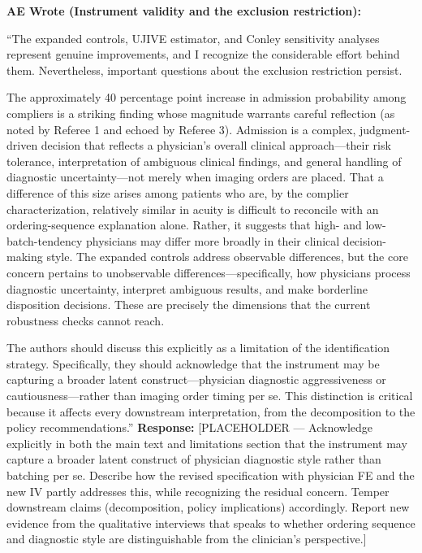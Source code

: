 \documentclass[11pt]{article}
\newenvironment{quote2}
{ \bigskip
\noindent
         \small\em
         \baselineskip=14pt
}
\newcommand{\1}{\hbox{\rm 1\kern-.35em 1}}
\begin{document}
\begin{quote2}
\textbf{AE Wrote (Instrument validity and the exclusion restriction):}

\noindent ``The expanded controls, UJIVE estimator, and Conley sensitivity analyses represent genuine improvements, and I recognize the considerable effort behind them. Nevertheless, important questions about the exclusion restriction persist.

The approximately 40 percentage point increase in admission probability among compliers is a striking finding whose magnitude warrants careful reflection (as noted by Referee 1 and echoed by Referee 3). Admission is a complex, judgment-driven decision that reflects a physician's overall clinical approach---their risk tolerance, interpretation of ambiguous clinical findings, and general handling of diagnostic uncertainty---not merely when imaging orders are placed. That a difference of this size arises among patients who are, by the complier characterization, relatively similar in acuity is difficult to reconcile with an ordering-sequence explanation alone. Rather, it suggests that high- and low-batch-tendency physicians may differ more broadly in their clinical decision-making style. The expanded controls address observable differences, but the core concern pertains to unobservable differences---specifically, how physicians process diagnostic uncertainty, interpret ambiguous results, and make borderline disposition decisions. These are precisely the dimensions that the current robustness checks cannot reach.

The authors should discuss this explicitly as a limitation of the identification strategy. Specifically, they should acknowledge that the instrument may be capturing a broader latent construct---physician diagnostic aggressiveness or cautiousness---rather than imaging order timing per se. This distinction is critical because it affects every downstream interpretation, from the decomposition to the policy recommendations.''
\end{quote2}

\noindent\textbf{Response:} \color{blue}[PLACEHOLDER --- Acknowledge explicitly in both the main text and limitations section that the instrument may capture a broader latent construct of physician diagnostic style rather than batching per se. Describe how the revised specification with physician FE and the new IV partly addresses this, while recognizing the residual concern. Temper downstream claims (decomposition, policy implications) accordingly. Report new evidence from the qualitative interviews that speaks to whether ordering sequence and diagnostic style are distinguishable from the clinician's perspective.]
\color{black}
\end{document}
